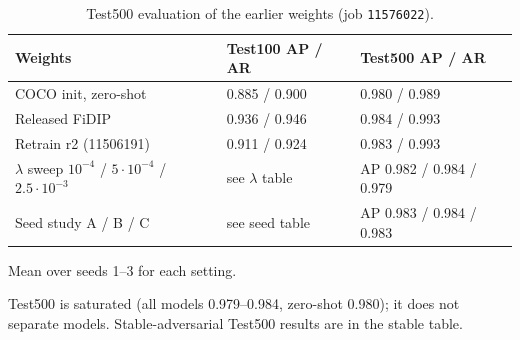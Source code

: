 \documentclass[10pt]{article}
\newcommand{\job}[1]{\texttt{#1}}
\begin{document}
\begin{table}[h]\centering\small
\begin{threeparttable}
\caption{Test500 evaluation of the earlier weights (job \job{11576022}).}
\label{tab:t500}
\begin{tabularx}{\linewidth}{X l l}
\toprule
Weights & Test100 AP / AR & Test500 AP / AR \\
\midrule
COCO init, zero-shot & 0.885 / 0.900 & 0.980 / 0.989 \\
Released FiDIP & 0.936 / 0.946 & 0.984 / 0.993 \\
Retrain r2 (11506191) & 0.911 / 0.924 & 0.983 / 0.993 \\
$\lambda$ sweep $10^{-4}$ / $5\cdot10^{-4}$ / $2.5\cdot10^{-3}$ & see $\lambda$ table & AP 0.982 / 0.984 / 0.979 \\
Seed study A / B / C\tnote{a} & see seed table & AP 0.983 / 0.984 / 0.983 \\
\bottomrule
\end{tabularx}
\begin{tablenotes}\footnotesize
\item[a] Mean over seeds 1--3 for each setting.
\item Test500 is saturated (all models 0.979--0.984, zero-shot 0.980); it does not separate models. Stable-adversarial Test500 results are in the stable table.
\end{tablenotes}
\end{threeparttable}
\end{table}
\end{document}
